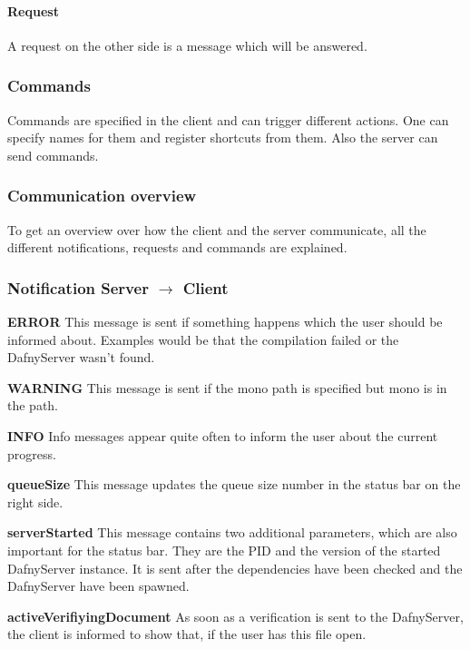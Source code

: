 \paragraph{Request}
A request on the other side is a message which will be answered.  

\subsubsection{Commands}
Commands are specified in the client and can trigger different actions. One can specify names for them and register shortcuts from them. Also the server can send commands. 

\subsubsection{Communication overview}
To get an overview over how the client and the server communicate, all the different notifications, requests and commands are explained. 


\subsubsection{Notification Server $\longrightarrow$ Client}

\textbf{ERROR}
This message is sent if something happens which the user should be informed about. Examples would be that the compilation failed or the DafnyServer wasn't found. \newline

\textbf{WARNING}
This message is sent if the mono path is specified but mono is in the path. \newline

\textbf{INFO}
Info messages appear quite often to inform the user about the current progress. \newline

\textbf{queueSize}
This message updates the queue size number in the status bar on the right side. \newline

\textbf{serverStarted}
This message contains two additional parameters, which are also important for the status bar. They are the PID and the version of the started DafnyServer instance. It is sent after the dependencies have been checked and the DafnyServer have been spawned. \newline

\textbf{activeVerifiyingDocument}
As soon as a verification is sent to the DafnyServer, the client is informed to show that, if the user has this file open. \newline

